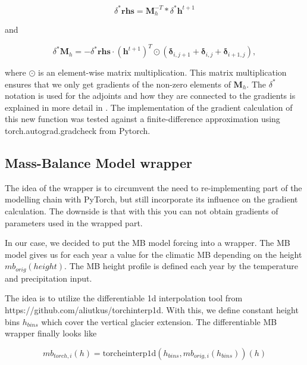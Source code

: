 \documentclass[journal abbreviation, manuscript]{copernicus}
\begin{document}
\begin{equation}
    \delta^*\boldsymbol{rhs} = \boldsymbol{M}_h^{-T} * \delta^* \boldsymbol{h}^{t+1}
\end{equation}

\noindent and

\begin{equation}
    \delta^*\boldsymbol{M}_h = - \delta^* \boldsymbol{rhs} \cdot (\boldsymbol{h}^{t+1})^T \odot (\boldsymbol{\delta}_{i, j + 1} + \boldsymbol{\delta}_{i, j} + \boldsymbol{\delta}_{i + 1, j}),
\end{equation}

\noindent where $\odot$ is an element-wise matrix multiplication. This matrix multiplication ensures that we only get gradients of the non-zero elements of $\boldsymbol{M}_h$. The $\delta^*$ notation is used for the adjoints and how they are connected to the gradients is explained in more detail in \cite{Goldberg2013}. The implementation of the gradient calculation of this new function was tested against a finite-difference approximation using \textsf{torch.autograd.gradcheck} from Pytorch.

\subsection{Mass-Balance Model wrapper}     %
\label{appendix:mb_model_wrapper}

The idea of the wrapper is to circumvent the need to re-implementing part of the modelling chain with PyTorch, but still incorporate its influence on the gradient calculation. The downside is that with this you can not obtain gradients of parameters used in the wrapped part.

In our case, we decided to put the MB model forcing into a wrapper. The MB model gives us for each year a value for the climatic MB depending on the height $mb_{orig}(height)$. The MB height profile is defined each year by the temperature and precipitation input.

The idea is to utilize the differentiable 1d interpolation tool from https://github.com/aliutkus/torchinterp1d. With this, we define constant height bins $h_{bins}$ which cover the vertical glacier extension. The differentiable MB wrapper finally looks like

\begin{equation}
    mb_{torch, i}(h) = \mathrm{torcheinterp1d}(h_{bins}, mb_{orig, i}(h_{bins}))(h)
\end{equation}
\end{document}
